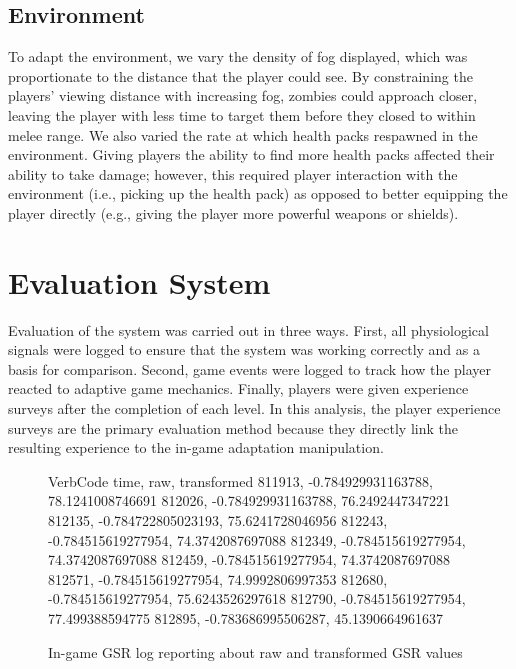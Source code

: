 \subsection{Environment}
To adapt the environment, we vary the density of fog displayed, which was proportionate to the distance that the player could see. By constraining the players’ viewing distance with increasing fog, zombies could approach closer, leaving the player with less time to target them before they closed to within melee range. We also varied the rate at which health packs respawned in the environment. Giving players the ability to find more health packs affected their ability to take damage; however, this required player interaction with the environment (i.e., picking up the health pack) as opposed to better equipping the player directly (e.g., giving the player more powerful weapons or shields).

\section{Evaluation System}

Evaluation of the system was carried out in three ways. First, all physiological signals were logged to ensure that the system was working correctly and as a basis for comparison. Second, game events were logged to track how the player reacted to adaptive game mechanics. Finally, players were given experience surveys after the completion of each level. In this analysis, the player experience surveys are the primary evaluation method because they directly link the resulting experience to the in-game adaptation manipulation.

\begin{figure}
  \centering
  \begin{SaveVerbatim}{VerbCode}
time, raw, transformed
811913, -0.784929931163788, 78.1241008746691
812026, -0.784929931163788, 76.2492447347221
812135, -0.784722805023193, 75.6241728046956
812243, -0.784515619277954, 74.3742087697088
812349, -0.784515619277954, 74.3742087697088
812459, -0.784515619277954, 74.3742087697088
812571, -0.784515619277954, 74.9992806997353
812680, -0.784515619277954, 75.6243526297618
812790, -0.784515619277954, 77.499388594775
812895, -0.783686995506287, 45.1390664961637
\end{SaveVerbatim}
  \setlength{\fboxsep}{5mm}
  \caption{In-game GSR log reporting about raw and transformed GSR values}
  \label{txt:log-gsr}
\end{figure}

